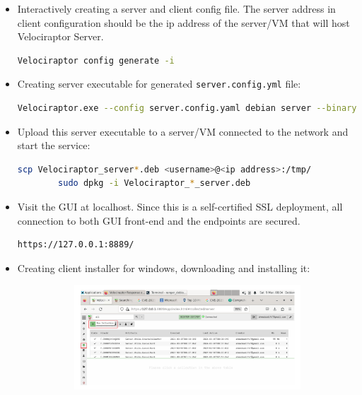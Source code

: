 \documentclass[a4paper, 11pt, oneside]{article} %
\begin{document}
\begin{itemize}
    \item Interactively creating a server and client config file. The server address in client configuration should be the ip address of the server/VM that will host Velociraptor Server. 
    \begin{lstlisting}[basicstyle=\ttfamily, breaklines=true, language=bash]
        Velociraptor config generate -i
    \end{lstlisting}
    \item Creating server executable for generated \verb|server.config.yml| file:
    \begin{lstlisting}[basicstyle=\ttfamily, breaklines=true, language=bash]
        Velociraptor.exe --config server.config.yaml debian server --binary Velociraptor-v0.6.0-linux-amd64
    \end{lstlisting}
    \item Upload this server executable to a server/VM connected to the network and start the service:
    \begin{lstlisting}[basicstyle=\ttfamily, breaklines=true, language=bash]
        scp Velociraptor_server*.deb <username>@<ip address>:/tmp/
        sudo dpkg -i Velociraptor_*_server.deb
    \end{lstlisting}
    \item Visit the GUI at localhost. Since this is a self-certified SSL deployment, all connection to both GUI front-end and the endpoints are secured.
    \begin{lstlisting}[basicstyle=\ttfamily, breaklines=true, language=bash]
        https://127.0.0.1:8889/
    \end{lstlisting}
    \item Creating client installer for windows, downloading and installing it:
    \begin{figure}[ht]
    \centering
    \begin{subfigure}{0.45\linewidth}
        \includegraphics[width=\linewidth, center]{img/install/1.png}

\end{subfigure}
\end{figure}
\end{itemize}
\end{document}
